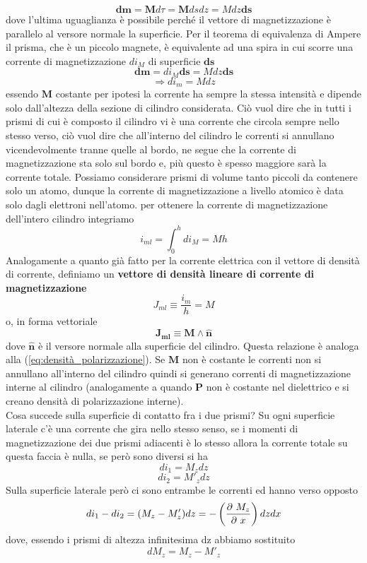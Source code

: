 \documentclass[
10pt, %
a4paper, %
oneside, %
headinclude,footinclude, %
BCOR5mm, %
]{scrartcl}
\begin{document}
\[\mathbf{dm} = \mathbf{M}d\tau = \mathbf{M} ds dz = M dz \mathbf{ds}\]  
dove l'ultima uguaglianza è possibile perché il vettore di magnetizzazione è parallelo al versore normale la superficie. Per il teorema di equivalenza di Ampere il prisma, che è un piccolo magnete, è equivalente ad una spira in cui scorre una corrente di magnetizzazione \(di_M\) di superficie \(\mathbf{ds}\)
\[\mathbf{dm} = di_M \mathbf{ds} = M dz \mathbf{ds}\]
\[\Rightarrow d i_m = M dz\]
essendo \(\mathbf{M}\) costante per ipotesi la corrente ha sempre la stessa intensità e dipende solo dall'altezza della sezione di cilindro considerata. Ciò vuol dire che in tutti i prismi di cui è composto il cilindro vi è una corrente che circola sempre nello stesso verso, ciò vuol dire che all'interno del cilindro le correnti si annullano vicendevolmente tranne quelle al bordo, ne segue che la corrente di magnetizzazione sta solo sul bordo e, più questo è spesso maggiore sarà la corrente totale. Possiamo considerare prismi di volume tanto piccoli da contenere solo un atomo, dunque la corrente di magnetizzazione a livello atomico è data solo dagli elettroni nell'atomo. per ottenere la corrente di magnetizzazione dell'intero cilindro integriamo
\[i_{ml} = \int_{0}^{h}di_M=Mh\]
Analogamente a quanto già fatto per la corrente elettrica con il vettore di densità di corrente, definiamo un \textbf{vettore di densità lineare di corrente di magnetizzazione}
\[J_{ml} \equiv \frac{i_m}{h}= M\]
o, in forma vettoriale
\[\mathbf{J_{ml}} \equiv \mathbf{M}\wedge \mathbf{\hat{n}}\]
dove \(\mathbf{\hat{n}}\) è il versore normale alla superficie del cilindro. Questa relazione è analoga alla (\ref{eq:densità_polarizzazione}). Se \(\mathbf{M}\) non è costante le correnti non si annullano all'interno del cilindro quindi si generano correnti di magnetizzazione interne al cilindro (analogamente a quando \(\mathbf{P}\) non è costante nel dielettrico e si creano densità di polarizzazione interne).\\
Cosa succede sulla superficie di contatto fra i due prismi? Su ogni superficie laterale c'è una corrente che gira nello stesso senso, se i momenti di magnetizzazione dei due prismi adiacenti è lo stesso allora la corrente totale su questa faccia è nulla, se però sono diversi si ha
\[di_1 = M_z dz\]
\[di_2 = M'_z dz\]
Sulla superficie laterale però ci sono entrambe le correnti ed hanno verso opposto
\[di_1 - di_2= (M_z-M'_z)dz = -\left(\frac{\partial\  M_z}{\partial\  x}\right)dzdx \]
dove, essendo i prismi di altezza infinitesima dz abbiamo sostituito
\[dM_z = M_z - M'_z\]
\end{document}
